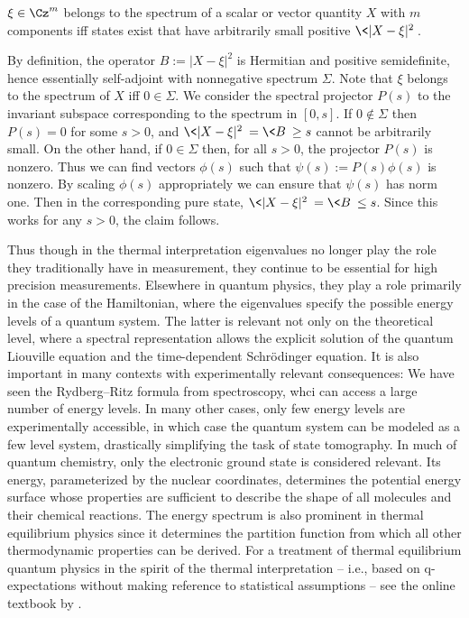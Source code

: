\documentclass[12pt]{article}
\begin{document}
\begin{thm}
$\xi\in\Cz^m$ belongs to the spectrum of a scalar or vector quantity $X$
with $m$ components iff states exist that have arbitrarily small 
positive $\<|X-\xi|^2\>$.
\end{thm}

\bepf
By definition, the operator $B:=|X-\xi|^2$ is Hermitian and positive 
semidefinite, hence essentially self-adjoint with nonnegative spectrum 
$\Sigma$. Note that $\xi$ belongs to the spectrum of $X$ iff 
$0\in\Sigma$. We consider the spectral projector $P(s)$ to the invariant
subspace corresponding to the spectrum in $[0,s]$. If $0\not\in\Sigma$
then $P(s)=0$ for some $s>0$, and $\<|X-\xi|^2\>=\<B\>\ge s$ cannot be 
arbitrarily small. On the other hand, if $0\in\Sigma$ then, for all 
$s>0$, the projector $P(s)$ is nonzero. Thus we can find vectors 
$\phi(s)$ such that $\psi(s):=P(s)\phi(s)$ is nonzero. By scaling 
$\phi(s)$ appropriately we can ensure that $\psi(s)$ has norm one. 
Then in the corresponding pure state, $\<|X-\xi|^2\>=\<B\>\le s$. 
Since this works for any $s>0$, the claim follows.
\epf

Thus though in the thermal interpretation eigenvalues no longer play
the role they traditionally have in measurement, they continue to be 
essential for high precision measurements. Elsewhere in quantum physics,
they play a role primarily in the case of the Hamiltonian, where the 
eigenvalues specify the possible energy levels of a quantum system.
The latter is relevant not only on the theoretical level, where a 
spectral representation allows the explicit solution of the quantum 
Liouville equation and the time-dependent Schr\"odinger equation. 
It is also important in many contexts with experimentally relevant 
consequences: We have seen the Rydberg--Ritz formula  from 
spectroscopy, whci can access a large number of energy levels. In many 
other cases, only few energy levels are experimentally accessible, in 
which case the quantum system can be modeled as a few 
level system, drastically simplifying the task of state tomography.
In much of quantum chemistry, only the electronic ground state is 
considered relevant. Its energy, parameterized by the nuclear 
coordinates, determines the potential energy surface whose properties 
are sufficient to describe the shape of all molecules and their 
chemical reactions. 
The energy spectrum is also prominent in thermal equilibrium physics 
since it determines the partition function from which all other 
thermodynamic properties can be derived. For a treatment of thermal 
equilibrium quantum physics in the spirit of the thermal interpretation
-- i.e., based on q-expectations without making reference to statistical
assumptions -- see the online textbook by  
\cite{NeuW}.
\end{document}
